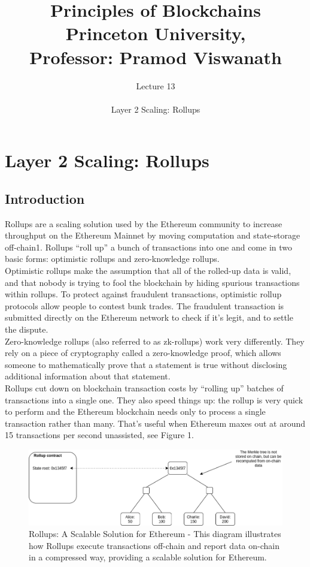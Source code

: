 \documentclass{report}
\title{\Huge{Principles of Blockchains \\ Princeton University,\\
		Professor: Pramod Viswanath}}
\author{\huge{Lecture 13} \\\\ Layer 2 Scaling: Rollups}
\begin{document}
\maketitle
\newpage%
\tableofcontents
\pagebreak

\chapter{Layer 2 Scaling: Rollups}

\section{Introduction}
Rollups are a scaling solution used by the Ethereum community to increase throughput on the Ethereum Mainnet by moving computation and state-storage off-chain1. Rollups “roll up” a bunch of transactions into one and come in two basic forms: optimistic rollups and zero-knowledge rollups.\\
Optimistic rollups make the assumption that all of the rolled-up data is valid, and that nobody is trying to fool the blockchain by hiding spurious transactions within rollups. To protect against fraudulent transactions, optimistic rollup protocols allow people to contest bunk trades. The fraudulent transaction is submitted directly on the Ethereum network to check if it’s legit, and to settle the dispute.\\
Zero-knowledge rollups (also referred to as zk-rollups) work very differently. They rely on a piece of cryptography called a zero-knowledge proof, which allows someone to mathematically prove that a statement is true without disclosing additional information about that statement.\\
Rollups cut down on blockchain transaction costs by “rolling up” batches of transactions into a single one. They also speed things up: the rollup is very quick to perform and the Ethereum blockchain needs only to process a single transaction rather than many. That’s useful when Ethereum maxes out at around 15 transactions per second unassisted, see Figure 1.
\begin{center}
	\begin{figure}
		\centering
		\includegraphics[width=0.8\linewidth]{Fig/F1}
		\caption{Rollups: A Scalable Solution for Ethereum - This diagram illustrates how Rollups execute transactions off-chain and report data on-chain in a compressed way, providing a scalable solution for Ethereum.
		}
		\label{fig:f1}
	\end{figure}
\end{center}
\end{document}
